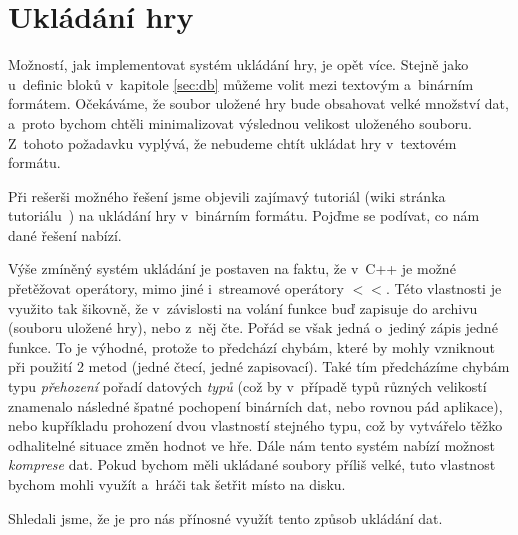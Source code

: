 
\section{Ukládání hry}
\label{sec:ukl}

Možností, jak implementovat systém ukládání hry, je opět více. Stejně jako u~definic bloků v~kapitole \ref{sec:db} můžeme volit mezi textovým a~binárním formátem. Očekáváme, že soubor uložené hry bude obsahovat velké množství dat, a~proto bychom chtěli minimalizovat výslednou velikost uloženého souboru. Z~tohoto požadavku vyplývá, že nebudeme chtít ukládat hry v~textovém formátu.

Při rešerši možného řešení jsme objevili zajímavý tutoriál (wiki stránka tutoriálu~\citep{ue_save_system}) na ukládání hry v~binárním formátu. Pojďme se podívat, co nám dané řešení nabízí.

Výše zmíněný systém ukládání je postaven na faktu, že v~C++ je možné přetěžovat operátory, mimo jiné i~streamové operátory $<<$. Této vlastnosti je využito tak šikovně, že v~závislosti na volání funkce buď zapisuje do archivu (souboru uložené hry), nebo z~něj čte. Pořád se však jedná o~jediný zápis jedné funkce. To je výhodné, protože to předchází chybám, které by mohly vzniknout při použití 2 metod (jedné čtecí, jedné zapisovací). Také tím předcházíme chybám typu \textit{přehození} pořadí datových \textit{typů} (což by v~případě typů různých velikostí znamenalo následné špatné pochopení binárních dat, nebo rovnou pád aplikace), nebo kupříkladu prohození dvou vlastností stejného typu, což by vytvářelo těžko odhalitelné situace změn hodnot ve hře. Dále nám tento systém nabízí možnost \textit{komprese} dat. Pokud bychom měli ukládané soubory příliš velké, tuto vlastnost bychom mohli využít a~hráči tak šetřit místo na disku.

Shledali jsme, že je pro nás přínosné využít tento způsob ukládání dat.
